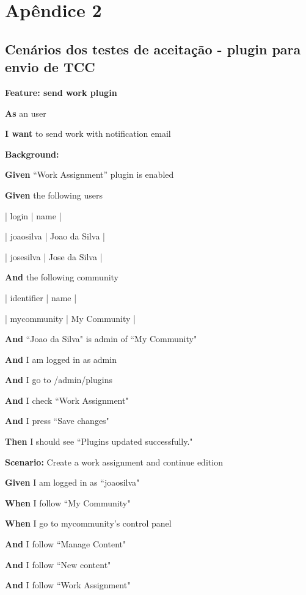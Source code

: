 \newpage
\chapter{Apêndice 2}
\label{apendice2}

\section{Cenários dos testes de aceitação - plugin para envio de TCC}


\textbf{Feature: send work plugin}

\textbf{As} an user

\textbf{I want} to send work with notification email

\textbf{Background:}

\textbf{Given} ``Work Assignment'' plugin is enabled

\textbf{Given} the following users

      | login     | name          |

      | joaosilva | Joao da Silva |

      | josesilva | Jose da Silva |

\textbf{And} the following community

      | identifier  | name         |

      | mycommunity | My Community |

\textbf{And} ``Joao da Silva" is admin of ``My Community"

\textbf{And} I am logged in as admin

\textbf{And} I go to /admin/plugins

\textbf{And} I check ``Work Assignment"

\textbf{And} I press ``Save changes"

\textbf{Then} I should see ``Plugins updated successfully." 

\item \textbf{Scenario:} Create a work assignment and continue edition

    \textbf{Given} I am logged in as ``joaosilva" 
    
    \textbf{When} I follow ``My Community"
    
    \textbf{When} I go to mycommunity's control panel
    
    \textbf{And} I follow ``Manage Content"
    
    \textbf{And} I follow ``New content"
    
    \textbf{And} I follow ``Work Assignment"

